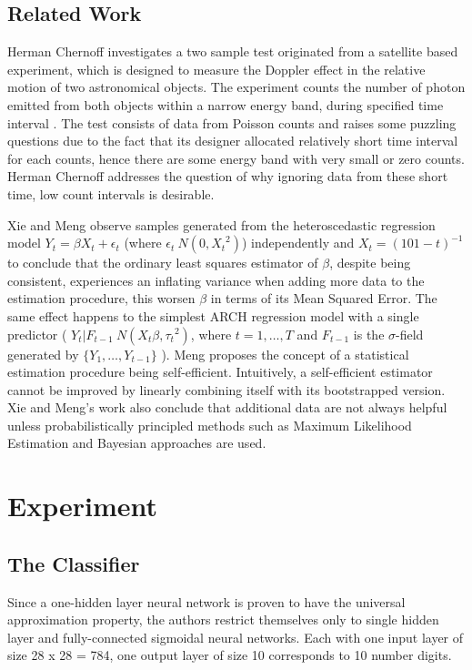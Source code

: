 \documentclass[conference]{IEEEtran}
\begin{document}
\subsection{Related Work}
Herman Chernoff investigates a two sample test originated from a satellite based experiment, which is designed to measure the Doppler effect in the relative motion of two astronomical objects. The experiment counts the number of photon emitted from both objects within a narrow energy band, during specified time interval \cite{WhenItSeem}. The test consists of data from Poisson counts and raises some puzzling questions due to the fact that its designer allocated relatively short time interval for each counts, hence there are some energy band with very small or zero counts. Herman Chernoff addresses the question of why ignoring data from these short time, low count intervals is desirable\cite{WhenItSeem}.

Xie and Meng observe samples generated from the heteroscedastic regression model ${Y_t} = \beta {X_t} + {\epsilon_t}$ (where ${\epsilon_t}~ N(0,{X_t}^2)$) independently and ${X_t}={(101-t)^{-1}}$ to conclude that the ordinary least squares estimator of $\beta$, despite being consistent, experiences an inflating variance when adding more data to the estimation procedure\cite{IGotMoreData}, this worsen $\beta$ in terms of its Mean Squared Error. The same effect happens to the simplest ARCH regression model with a single predictor ( ${Y_t}|{F_{t-1}}~N({X_t}\beta,{\tau_t}^2)$, where $t=1,\ldots,T$ and ${F_{t - 1}}$ is the $\sigma$-field generated by $\{{Y_1},\ldots,{Y_{t-1}}\}$ )\cite{IGotMoreData}. Meng proposes the concept of a statistical estimation procedure being self-efficient\cite{Meng94}. Intuitively, a self-efficient estimator cannot be improved by linearly combining itself with its bootstrapped version\cite{IGotMoreData}. Xie and Meng's work also conclude that additional data are not always helpful unless probabilistically principled methods such as Maximum Likelihood Estimation and Bayesian approaches are used\cite{IGotMoreData}.
\section{Experiment}
\label{sec:Experiment}

\subsection{The Classifier}
Since a one-hidden layer neural network is proven to have the universal approximation property\cite{Hornik_Universal_appro}, the authors restrict themselves only to single hidden layer and fully-connected sigmoidal neural networks. Each with one input layer of size 28 x 28 = 784, one output layer of size 10 corresponds to 10 number digits.
\end{document}
